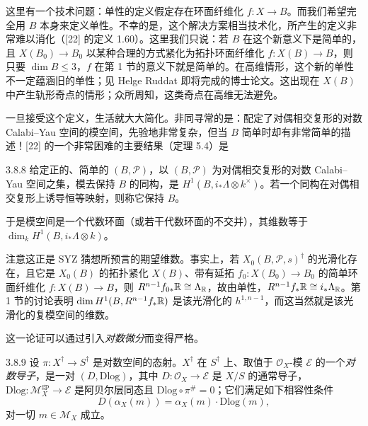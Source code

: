 这里有一个技术问题：单性的定义假定存在环面纤维化 $f:X\to B$。而我们希望完全用 $B$ 本身来定义单性。不幸的是，这个解决方案相当技术化，所产生的定义非常难以消化（[22] 的定义 1.60）。这里我们只说：若 $B$ 在这个新意义下是简单的，且 $X(B_0)\to B_0$ 以某种合理的方式紧化为拓扑环面纤维化 $f:X(B)\to B$，则只要 $\dim B\le3$，$f$ 在第 1 节的意义下就是简单的。在高维情形，这个新的单性不一定蕴涵旧的单性；见 Helge Ruddat 即将完成的博士论文。这出现在 $X(B)$ 中产生轨形奇点的情形；众所周知，这类奇点在高维无法避免。

一旦接受这个定义，生活就大大简化。非同寻常的是：配定了对偶相交复形的对数 Calabi--Yau 空间的模空间，先验地非常复杂，但当 $B$ 简单时却有非常简单的描述！[22] 的一个非常困难的主要结果（定理 5.4）是

\begin{theorem}{3.8.8}
给定正的、简单的 $(B,\mathcal P)$，以 $(B,\mathcal P)$ 为对偶相交复形的对数 Calabi--Yau 空间之集，模去保持 $B$ 的同构，是 $H^1(B,i_*\Lambda\otimes k^\times)$。若一个同构在对偶相交复形上诱导恒等映射，则称它保持 $B$。
\end{theorem}

于是模空间是一个代数环面（或若干代数环面的不交并），其维数等于 $\dim_kH^1(B,i_*\Lambda\otimes k)$。

注意这正是 SYZ 猜想所预言的期望维数。事实上，若 $X_0(B,\mathcal P,s)^\dagger$ 的光滑化存在，且它是 $X_0(B)$ 的拓扑紧化 $X(B)$、带有延拓 $f_0:X(B_0)\to B_0$ 的简单环面纤维化 $f:X(B)\to B$，则 $R^{n-1}f_{0*}\mathbb{R}\cong\Lambda_{\mathbb{R}}$，故由单性，$R^{n-1}f_*\mathbb{R}\cong i_*\Lambda_{\mathbb{R}}$。第 1 节的讨论表明 $\dim H^1(B,R^{n-1}f_*\mathbb{R})$ 是该光滑化的 $h^{1,n-1}$，而这当然就是该光滑化的复模空间的维数。

这一论证可以通过引入\emph{对数微分}而变得严格。

\begin{definition}{3.8.9}
设 $\pi:X^\dagger\to S^\dagger$ 是对数空间的态射。$X^\dagger$ 在 $S^\dagger$ 上、取值于 $\mathcal O_X$-模 $\mathcal E$ 的一个\emph{对数导子}，是一对 $(D,\mathrm{Dlog})$，其中 $D:\mathcal O_X\to\mathcal E$ 是 $X/S$ 的通常导子，$\mathrm{Dlog}:\mathcal M_X^{\mathrm{gp}}\to\mathcal E$ 是阿贝尔层同态且 $\mathrm{Dlog}\circ\pi^\#=0$；它们满足如下相容性条件
\[
D(\alpha_X(m))=\alpha_X(m)\cdot\mathrm{Dlog}(m),
\]
对一切 $m\in\mathcal M_X$ 成立。
\end{definition}

